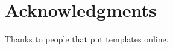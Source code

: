 

\bigskip

\begingroup
\let\clearpage\relax
\let\cleardoublepage\relax
\let\cleardoublepage\relax
\chapter*{Acknowledgments}

Thanks to people that put templates online.  



\endgroup
